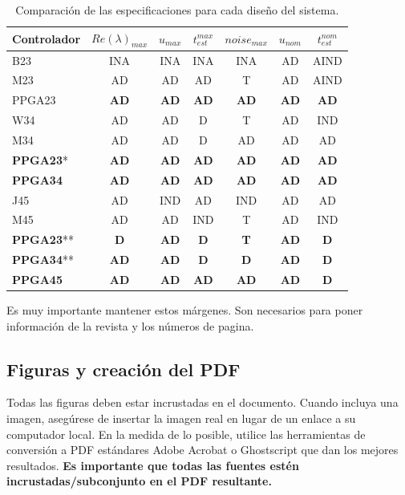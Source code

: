 \documentclass[5p,times,authoryear]{elsarticle}
\begin{document}
\begin{table}
\centering
\caption{Comparación de las especificaciones para cada diseño del sistema. }
\label{tabladeseables}
\begin{tabular}{lcccccc}   \hline
Controlador  & $Re(\lambda)_{max}$  & $u_{max}$ & $t_{est}^{max}$ & $noise_{max}$ & $u_{nom}$ & $t_{est}^{nom}$  \\ \hline
B23 & INA & INA & INA & INA & AD & AIND \\
M23 & AD & AD & AD & T & AD & AIND \\
PPGA23 & \textbf{AD} & \textbf{AD}& \textbf{AD}&\textbf{AD} &\textbf{AD} & \textbf{AD}\\
 \hline
 W34 & AD & AD & D & T & AD & IND \\
 M34 & AD & AD & D & AD & AD & AD \\
 \textbf{PPGA23}* & \textbf{AD} & \textbf{AD} & \textbf{AD} & \textbf{AD} & \textbf{AD} & \textbf{AD} \\
 \textbf{PPGA34} & \textbf{AD} & \textbf{AD} & \textbf{AD} & \textbf{AD} & \textbf{AD} & \textbf{AD} \\
  \hline
J45 & AD & IND & AD & IND & AD & AD \\
M45 & AD & AD & IND & T & AD & IND \\
\textbf{PPGA23}**& \textbf{D} & \textbf{AD} & \textbf{D} & \textbf{T} & \textbf{AD} & \textbf{D} \\
\textbf{PPGA34}**& \textbf{AD} & \textbf{AD} & \textbf{D} & \textbf{D} & \textbf{AD} & \textbf{D}  \\
\textbf{PPGA45} & \textbf{AD} & \textbf{AD} & \textbf{AD} & \textbf{AD} & \textbf{AD} & \textbf{D} \\
 \hline
\end{tabular}
\end{table}

Es muy importante mantener estos márgenes. Son necesarios para poner información de la revista y los números de pagina.

\subsection{Figuras y creación del PDF}
Todas las figuras deben estar incrustadas en el documento. Cuando incluya una imagen, asegúrese de insertar la imagen real en lugar de un enlace a su computador local. En la medida de lo posible, utilice las herramientas de conversión a PDF estándares Adobe Acrobat o Ghostscript que dan los mejores resultados. \textbf{Es importante que todas las fuentes estén incrustadas/subconjunto en el PDF resultante.}
\end{document}
